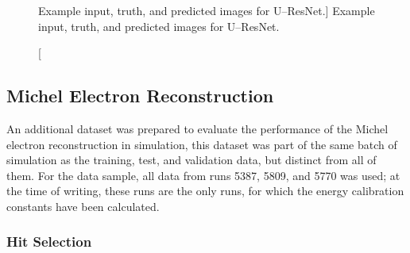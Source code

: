 \begin{figure}
	\caption
	[Example input, truth, and predicted images for U--ResNet.]
	{Example input, truth, and predicted images for U--ResNet.}
	\label{fig:unet_example}
\end{figure}

\subsection{Michel Electron Reconstruction}

An additional dataset was prepared to evaluate the performance of the Michel
electron reconstruction in simulation, this dataset was part of the same batch 
of simulation as the training, test, and validation data, but distinct from 
all of them. For the \protodune{} data sample, all data from runs 5387, 5809, 
and 5770 was used; at the time of writing, these runs are the only runs, for 
which the energy calibration constants have been calculated.

\subsubsection{Hit Selection}

